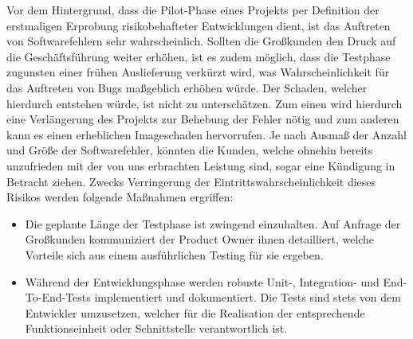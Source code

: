 Vor dem Hintergrund, dass die Pilot-Phase eines Projekts per Definition der erstmaligen Erprobung risikobehafteter Entwicklungen dient, ist das Auftreten von Softwarefehlern sehr wahrscheinlich. Sollten die Großkunden den Druck auf die Geschäftsführung weiter erhöhen, ist es zudem möglich, dass die Testphase zugunsten einer frühen Auslieferung verkürzt wird, was Wahrscheinlichkeit für das Auftreten von Bugs maßgeblich erhöhen würde. Der Schaden, welcher hierdurch entstehen würde, ist nicht zu unterschätzen. Zum einen wird hierdurch eine Verlängerung des Projekts zur Behebung der Fehler nötig und zum anderen kann es einen erheblichen Imageschaden hervorrufen. Je nach Ausmaß der Anzahl und Größe der Softwarefehler, könnten die Kunden, welche ohnehin bereits unzufrieden mit der von uns erbrachten Leistung sind, sogar eine Kündigung in Betracht ziehen. Zwecks Verringerung der Eintrittswahrscheinlichkeit dieses Risikos werden folgende Maßnahmen ergriffen:
\begin{itemize}
	\item Die geplante Länge der Testphase ist zwingend einzuhalten. Auf Anfrage der Großkunden kommuniziert der Product Owner ihnen detailliert, welche Vorteile sich aus einem ausführlichen Testing für sie ergeben.
	\item Während der Entwicklungsphase werden robuste Unit-, Integration- und End-To-End-Tests implementiert und dokumentiert. Die Tests sind stets von dem Entwickler umzusetzen, welcher für die Realisation der entsprechende Funktionseinheit oder Schnittstelle verantwortlich ist. 
\end{itemize}